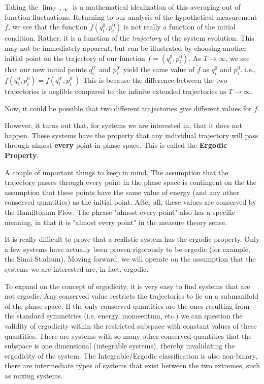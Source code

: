 \documentclass{book}
\begin{document}

Taking the $\lim_{T\to\infty}$ is a mathematical idealization of this averaging out of function fluctuations.  Returning to our analysis of the hypothetical measurement $\overline{f}$, we see that the function $\widetilde{f}(q_{i}^0,p_{i}^0)$ is not really a function of the initial condition.  Rather, it is a function of the \textit{trajectory} of the system evolution.  This may not be immediately apparent, but can be illustrated by choosing another initial point on the trajectory of our function $\widetilde{f}=(q_{i}^0,p_{i}^0)$.  As $T\to\infty$, we see that our new initial points $q_{i}^{0'}$ and $p_{i}^{0'}$ yield the same value of $\widetilde{f}$ as $q_{i}^0$ and $p_{i}^0$.  i.e., $\widetilde{f}(q_{i}^0,p_{i}^0)=\widetilde{f}(q_{i}^{0'},p_{i}^{0'})$  This is because the difference between the two trajectories is neglible compared to the infinite extended trajectories as $T\to\infty$.


Now, it could be possible that two different trajectories give different values for $\overline{f}$.


However, it turns out that, for systems we are interested in, that it does not happen.  These systems have the property that any individual trajectory will pass through almost \textbf{every} point in phase space.  This is called the \textbf{Ergodic Property}.  

A couple of important things to keep in mind.  The assumption that the trajectory passes through every point in the phase space is contingent on the the assumption that these points have the same value of energy (and any other conserved quantities) as the initial point.  After all, these values are conserved by the Hamiltonian Flow.  The phrase "almost every point" also has a specific meaning, in that it is "almost every point" in the measure theory sense.

It is really difficult to prove that a realistic system has the ergodic property.  Only a few systems have actually been proven rigorously to be ergodic (for example, the Sinai Stadium).  Moving forward, we will operate on the assumption that the systems we are interested are, in fact, ergodic.    

To expand on the concept of ergodicity, it is very easy to find systems that are not ergodic.  Any conserved value restricts the trajectories to lie on a submanifold of the phase space.  If the only conserved quantities are the ones resulting from the standard symmetries (i.e. energy, momeentum, etc.) we can question the validity of ergodicity within the restricted subspace with constant values of these quantities.  There are systems with so many other conserved quantities that the subspace is one dimensional (integrable systems), thereby invalidating the ergodicity of the system.  The Integrable/Ergodic classification is also non-binary, there are intermediate types of systems that exist between the two extremes, such as mixing systems.
\end{document}
